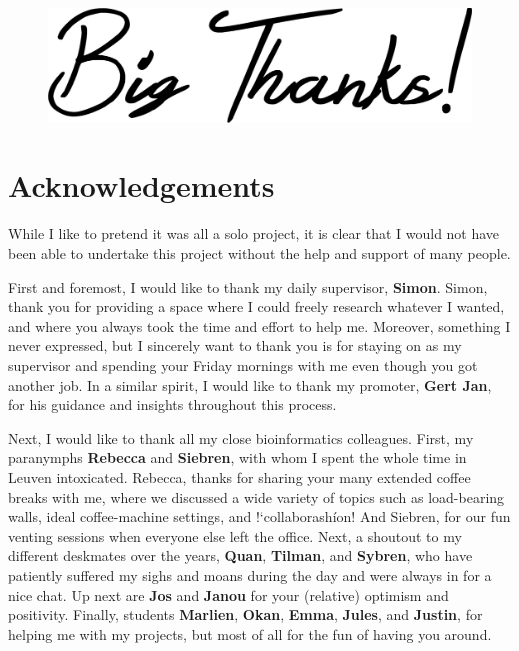 \vspace*{\fill}
\begin{figure}[H]
    \centering
    \includegraphics[width=0.8\linewidth]{ch.appendix/imgs/bigthanks.png}
\end{figure}
\vspace*{\fill}

\newpage

\section{Acknowledgements}

\noindent
While I like to pretend it was all a solo project, it is clear that I would not have been able to undertake this project without the help and support of many people.

\bigbreak \noindent
First and foremost, I would like to thank my daily supervisor, \textbf{Simon}. Simon, thank you for providing a space where I could freely research whatever I wanted, and where you always took the time and effort to help me. Moreover, something I never expressed, but I sincerely want to thank you is for staying on as my supervisor and spending your Friday mornings with me even though you got another job. In a similar spirit, I would like to thank my promoter, \textbf{Gert Jan}, for his guidance and insights throughout this process.

\bigbreak \noindent
Next, I would like to thank all my close bioinformatics colleagues. First, my paranymphs \textbf{Rebecca} and \textbf{Siebren}, with whom I spent the whole time in Leuven intoxicated. Rebecca, thanks for sharing your many extended coffee breaks with me, where we discussed a wide variety of topics such as load-bearing walls, ideal coffee-machine settings, and !`collaborash\'ion! And Siebren, for our fun venting sessions when everyone else left the office. Next, a shoutout to my different deskmates over the years, \textbf{Quan}, \textbf{Tilman}, and \textbf{Sybren}, who have patiently suffered my sighs and moans during the day and were always in for a nice chat. Up next are \textbf{Jos} and \textbf{Janou} for your (relative) optimism and positivity. Finally,  students \textbf{Marlien}, \textbf{Okan}, \textbf{Emma}, \textbf{Jules}, and \textbf{Justin}, for helping me with my projects, but most of all for the fun of having you around. 

